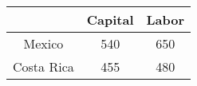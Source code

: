 \begin{table}[ht]
    \centering
    \begin{tabular}{|c|c|c|}
    \hline
     & Capital & Labor \\
    \hline
    Mexico & 540 & 650 \\
    \hline
    Costa Rica & 455 & 480 \\
    \hline
    \end{tabular}
    \end{table}